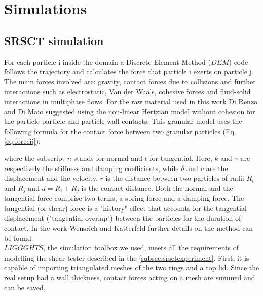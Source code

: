 \begin{appendix}
\label{appendix}

\section{Simulations}
\label{sec:appsimulations}

\subsection{SRSCT simulation}
\label{subsec:srsctsimulation}
For each particle i inside the domain a Discrete Element Method ($DEM$) code
follows the trajectory and calculates the force that particle i exerts on particle j.
The main forces involved are: gravity, contact forces due to collisions and further interactions such as electrostatic, 
Van der Waals, cohesive forces and fluid-solid interactions in multiphase flows. For the raw material used in this work 
Di Renzo and Di Maio \cite{RefWorks:145} suggested using the non-linear Hertzian model without cohesion for 
the particle-particle and particle-wall contacts. 
This granular model uses the following formula for the contact force between two granular particles (Eq. \ref{eq:forceij}):

where the subscript $n$ stands for normal and $t$ for tangential. 
Here, $k$ and $\gamma$ are respectively the stiffness and damping coefficients, 
while $\delta$ and $v$ are the displacement and the velocity, $r$ is the
distance between two particles of radii $R_i$ and $R_j$ and $d = R_i + R_j $ is the
contact distance.
Both the normal and the tangential
force comprise two terms, a spring force and a damping force. 
The tangential (or shear) force is a "history" effect that accounts for the
tangential displacement ("tangential overlap") between the particles for the duration of contact. 
In the work Wensrich and Katterfeld \cite{RefWorks:87} further details on the
method can be found.\\
$LIGGGHTS$, the simulation toolbox we used, meets all the requirements of
modelling the shear tester described in the \ref{subsec:srsctexperiment}. 
First, it is capable of importing triangulated meshes of the two rings and a top lid. 
Since the real setup had a wall thickness, contact forces acting on a mesh are summed and can be saved, 

\end{appendix}
